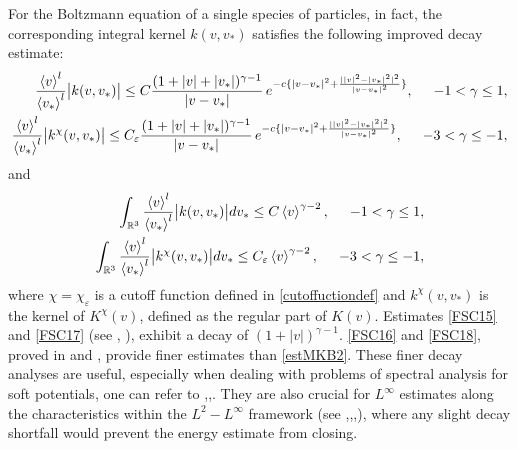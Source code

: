 \documentclass[reqno]{amsart}
\numberwithin{equation}{section}
\numberwithin{equation}{section}
\begin{document}
For the Boltzmann equation of a single species of particles, in fact, the corresponding integral kernel $k(v,v_*)$ satisfies the following improved decay estimate: 		
\begin{align}
		\frac{\left \langle v \right\rangle^l}{\left \langle v_* \right\rangle^l}\big|k(v,v_*)\big|\leq C \frac{(1+|v|+|v_*|)^{\gamma-1}}{|v-v_*|} \, e^{-c\{|v-v_*|^2+\frac{||v|^2-|v_*|^2|^2}{|v-v_*|^2}\}}, \hspace{0.5cm}-1<\gamma \leq 1,\label{FSC15}\\
		\frac{\left \langle v \right\rangle^l}{\left \langle v_* \right\rangle^l}\big|k^{\chi}(v,v_*)\big|\leq C_{\varepsilon} \frac{(1+|v|+|v_*|)^{\gamma-1}}{|v-v_*|} \, e^{-c\{|v-v_*|^2+\frac{||v|^2-|v_*|^2|^2}{|v-v_*|^2}\}}, \hspace{0.5cm}-3<\gamma \leq -1,\label{FSC16}
\end{align}
and 
\begin{align}
	\int_{\mathbb{R}^3 } \frac{\left \langle v \right\rangle^l}{\left \langle v_* \right\rangle^l}\big|k(v,v_*)\big| d v_*\leq C \left \langle v \right\rangle^{\gamma-2},\hspace{0.5cm}-1<\gamma \leq 1,\label{FSC17}\\
	\int_{\mathbb{R}^3 } \frac{\left \langle v \right\rangle^l}{\left \langle v_* \right\rangle^l}\big|k^{\chi}(v,v_*)\big| d v_*\leq C_{\varepsilon} \left \langle v \right\rangle^{\gamma-2},\hspace{0.5cm}-3<\gamma \leq -1,\label{FSC18}
\end{align}
 where $\chi=\chi_{\varepsilon}$ is a cutoff function defined in \eqref{cutoffuctiondef} and $k^{\chi}(v,v_*)$ is the kernel of $K^{\chi}(v)$, defined as the regular part of $K(v)$. Estimates \eqref{FSC15} and \eqref{FSC17} (see \cite{[DiJMP]Guo}, \cite{[19]Guo2010ARMA}), ‌exhibit‌ a decay of $(1+|v|)^{\gamma-1}$.  \eqref{FSC16} and \eqref{FSC18}, proved in \cite{[impvR]Guo2003} and \cite{[2017]ARMLSQ}, provide finer estimates than \eqref{estMKB2}.‌ These finer decay analyses are useful, ‌especially‌ when dealing with problems of spectral analysis for soft potentials, one can refer to \cite{[DYZSF]VPB},\cite{[meq]LYZ},\cite{[PG]Liu2004}. They are also crucial  for  $L^{\infty}$  estimates along the characteristics within the $L^2-L^{\infty}$ framework (see \cite{[20]Guo2021ARMA},\cite{[22]Guo2010CPAM},\cite{[inp]LIWANG2023SIAM},\cite{[OY]2025J}), where any slight decay shortfall would prevent the energy estimate from closing.
 
\end{document}
